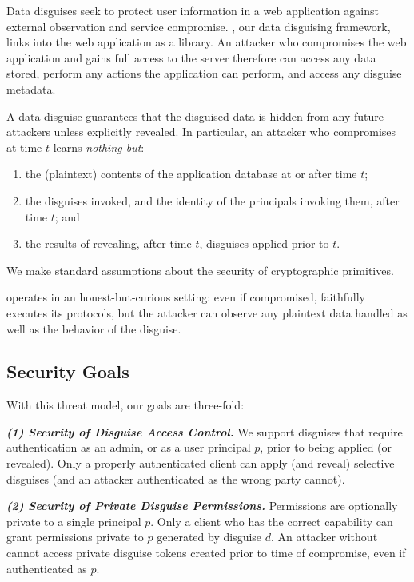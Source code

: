 %
Data disguises seek to protect user information in a web application against external observation
and service compromise.
%
\sys, our data disguising framework, links into the web application as a library.
%
An attacker who compromises the web application and gains full access to the server therefore
can access any data stored, perform any actions the application can perform, and access any
disguise metadata.
%

%
A data disguise guarantees that the disguised data is hidden from any future attackers unless
explicitly revealed.
%
In particular, an attacker who compromises \sys at time $t$ learns \emph{nothing but}:
\begin{enumerate}[nosep]
  \item the (plaintext) contents of the application database at or after time $t$;
  \item the disguises invoked, and the identity of the principals invoking them, after time $t$; and
  \item the results of revealing, after time $t$, disguises applied prior to $t$.
\end{enumerate}
%
We make standard assumptions about the security of cryptographic primitives.
%

%
\sys operates in an honest-but-curious setting: even if compromised, \sys faithfully executes
its protocols, but the attacker can observe any plaintext data handled as well as the behavior
of the disguise.
%

\subsection{Security Goals}

With this threat model, our goals are three-fold: 

\vspace{6pt}\noindent\textbf{\emph{(1) Security of Disguise Access Control.}}
We support disguises that require authentication as an admin, or as a user principal $p$, prior to being applied (or
revealed). Only a properly authenticated client can apply (and reveal) selective disguises
(and an attacker authenticated as the wrong party cannot).

\vspace{6pt}\noindent\textbf{\emph{(2) Security of Private Disguise Permissions.}}
Permissions are optionally private to a single principal $p$. 
Only a client who has the correct capability  can grant \sys permissions private to $p$ generated
by disguise $d$.
%
An attacker without  cannot access private disguise tokens created prior to time of compromise, even if authenticated as $p$.


